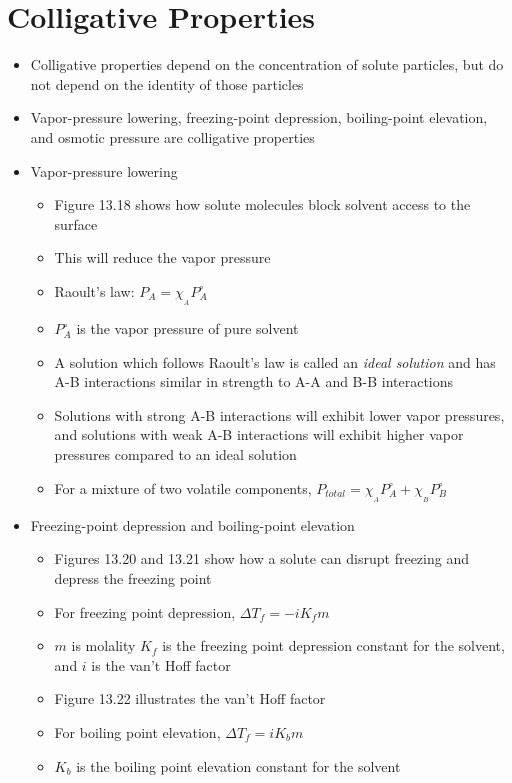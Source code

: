 \documentclass[12pt, openany, letterpaper]{memoir}
\begin{document}
\section{Colligative Properties}
\begin{itemize}
	\item Colligative properties depend on the concentration of solute particles, but do not depend on the identity of those particles
	\item Vapor-pressure lowering, freezing-point depression, boiling-point elevation, and osmotic pressure are colligative properties
	\item Vapor-pressure lowering
	\begin{itemize}
		\item Figure 13.18 shows how solute molecules block solvent access to the surface
		\item This will reduce the vapor pressure
		\item Raoult's law: $P_A=\chi_{_A}P^\circ_A$
		\item $P^\circ_A$ is the vapor pressure of pure solvent 
		\item A solution which follows Raoult's law is called an \emph{ideal solution} and has A-B interactions similar in strength to A-A and B-B interactions
		\item Solutions with strong A-B interactions will exhibit lower vapor pressures, and solutions with weak A-B interactions will exhibit higher vapor pressures compared to an ideal solution
		\item For a mixture of two volatile components, $P_{total} = \chi_{_A}P^\circ_A + \chi_{_B}P^\circ_B$
	\end{itemize}
	\item Freezing-point depression and boiling-point elevation
	\begin{itemize}
		\item Figures 13.20 and 13.21 show how a solute can disrupt freezing and depress the freezing point
    \item For freezing point depression, $\Delta T_{f} = -iK_fm$
		\item $m$ is molality $K_f$ is the freezing point depression constant for the solvent, and $i$ is the van't Hoff factor
    \item Figure 13.22 illustrates the van't Hoff factor
		\item For boiling point elevation, $\Delta T_{f} = iK_bm$ 
		\item $K_b$ is the boiling point elevation constant for the solvent

\end{itemize}
\end{itemize}
\end{document}
